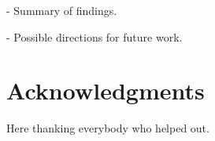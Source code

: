 \documentclass{sigchi}
\begin{document}
- Summary of findings.

- Possible directions for future work.

\section{Acknowledgments}

Here thanking everybody who helped out.

%
%
%
%
%
\balance{}



\end{document}
